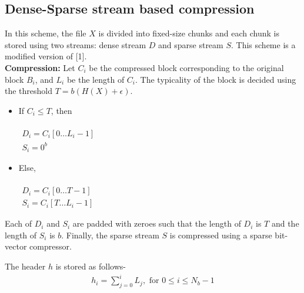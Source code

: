 \subsection{Dense-Sparse stream based compression}
In this scheme, the file $X$ is divided into fixed-size chunks and each chunk is stored using two streams: dense stream $D$ and sparse stream $S$. This scheme is a modified version of [1]. \\
\textbf{Compression:} Let $C_i$ be the compressed block corresponding to the original block $B_i$, and $L_i$ be the length of $C_i$. The typicality of the block is decided using the threshold $T = b (H(X) + \epsilon)$.
\begin{itemize}
    \item If $C_i \leq T $, then \\~\\
         \smallskip \hspace{5ex}$
        \begin{gathered}
            D_i = C_i[0 \ldots L_i-1] \\
            S_i = 0 ^ b
        \end{gathered}
        $
    \item Else,\\~\\
        \smallskip \hspace{5ex} $
        \begin{gathered}
            D_i = C_i[0 \ldots T-1] \\
            S_i = C_i[T \ldots L_i-1]
        \end{gathered}
        $
\end{itemize}
Each of $D_i$ and $S_i$ are padded with zeroes such that the length of $D_i$ is $T$ and the length of $S_i$ is $b$. 
Finally, the sparse stream $S$ is compressed using a sparse bit-vector compressor.

The header $h$ is stored as follows-
$$
\begin{gathered}
    h_i = \sum_{j=0}^{i} L_j, \text{ for } 0 \leq i \leq N_b - 1 \\
\end{gathered}
$$

